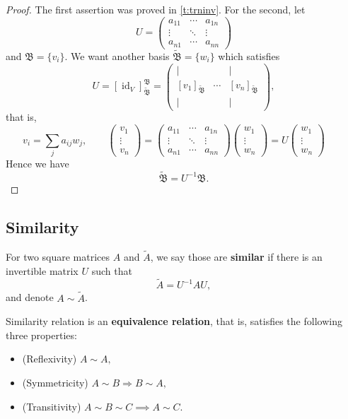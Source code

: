 \begin{proof}
The first assertion was proved in \cref{t:trninv}. For the second, let $$U = \begin{pmatrix}a_{11}&\cdots &a_{1n} \\ \vdots &\ddots &\vdots \\a_{n1}&\cdots&a_{nn} \end{pmatrix}$$ and $\mathfrak B = \{v_i\}$. We want another basis $\tilde{\mathfrak B} = \{w_i\}$ which satisfies $$U = [\operatorname{id}_V]^\mathfrak B _{\tilde{ \mathfrak B}} = \begin{pmatrix} | & & | \\ [v_1]_{\tilde{ \mathfrak B}} & \cdots & [v_n]_{\tilde{ \mathfrak B}} \\ | && | \end{pmatrix},$$ that is, $$v_i = \sum_{j} a_{ij}w_j, \qquad \begin{pmatrix} v_1 \\ \vdots \\ v_n \end{pmatrix} = \begin{pmatrix}a_{11}&\cdots &a_{1n} \\ \vdots &\ddots &\vdots \\a_{n1}&\cdots&a_{nn} \end{pmatrix}\begin{pmatrix} w_1 \\ \vdots \\ w_n \end{pmatrix} = U \begin{pmatrix} w_1 \\ \vdots \\ w_n \end{pmatrix} \qquad $$ Hence we have $$\tilde{\mathfrak B} = U^{-1}\mathfrak B.$$
\end{proof}
\subsection{Similarity}
\begin{defn}[similarity]
For two square matrices $A$ and $\tilde A$, we say those are \textbf{similar} if there is an invertible matrix $U$ such that $$\tilde A = U^{-1}AU,$$and denote $A\sim \tilde A$.
\end{defn}
\begin{prop}
Similarity relation is an \textbf{equivalence relation}, that is, satisfies the following three properties: \begin{itemize}
\item (Reflexivity) $A \sim A,$
\item (Symmetricity) $A \sim B \Longrightarrow B \sim A,$
\item (Transitivity) $A\sim B \sim C \implies A\sim C.$
\end{itemize}
\end{prop}


